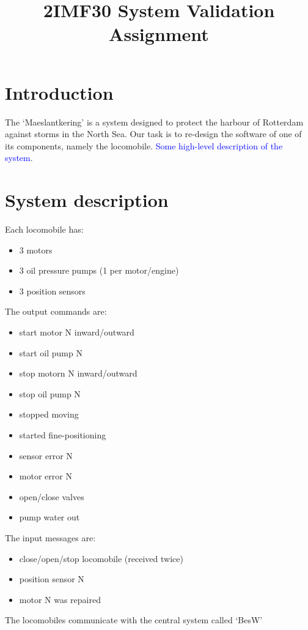 \documentclass{article}
\title{2IMF30 System Validation Assignment}
\begin{document}
\section{Introduction}
The `Maeslantkering' is a system designed to protect the harbour of Rotterdam against storms in the North Sea. Our task is to re-design the software of one of its components, namely the locomobile. \textcolor{blue}{Some high-level description of the system}.

\section{System description}
Each locomobile has:
\begin{itemize}
    \item 3 motors
    \item 3 oil pressure pumps (1 per motor/engine)
    \item 3 position sensors
\end{itemize}
The output commands are:
\begin{itemize}
    \item start motor N inward/outward
    \item start oil pump N
    \item stop motorn N inward/outward
    \item stop oil pump N

    \item stopped moving
    \item started fine-positioning
    \item sensor error N
    \item motor error N

    \item open/close valves
    \item pump water out
\end{itemize}
The input messages are:
\begin{itemize}
    \item close/open/stop locomobile (received twice)
    \item position sensor N
    \item motor N was repaired
\end{itemize}

The locomobiles communicate with the central system called `BesW'
\end{document}
